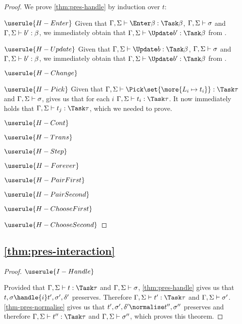 \begin{proof}
  We prove \cref{thm:pres-handle} by induction over $t$:

\case
  {$\userule{H-Enter}$}
  {Given that $\Gamma,\Sigma\infers \Enter \beta :\Task\beta$, $\Gamma,\Sigma\vdash\sigma$ and $\Gamma,\Sigma\vdash b':\beta$, we immediately obtain that $\Gamma,\Sigma\infers\Update b':\Task\beta$ from . }

\case
  {$\userule{H-Update}$}
  {Given that $\Gamma,\Sigma\infers \Update b :\Task\beta$, $\Gamma,\Sigma\vdash\sigma$ and $\Gamma,\Sigma\vdash b':\beta$, we immediately obtain that $\Gamma,\Sigma\infers\Update b':\Task\beta$ from .}

\case
  {$\userule{H-Change}$}
  {\todo{}}

\case
  {$\userule{H-Pick}$}
  {Given that $\Gamma,\Sigma\infers \Pick\set{\more{L_i \mapsto t_i}} :\Task\tau$ and $\Gamma,\Sigma\vdash\sigma$,  gives us that for each $i$ $\Gamma,\Sigma\infers t_i:\Task\tau$.
  It now immediately holds that $\Gamma,\Sigma\infers t_j:\Task\tau$, which we needed to prove.}

\case
  {$\userule{H-Cont}$}
  {}

\case
  {$\userule{H-Trans}$}
  {}

\case
  {$\userule{H-Step}$}
  {}

\case
  {$\userule{H-Forever}$}
  {}

\case
  {$\userule{H-PairFirst}$}
  {}

\case
  {$\userule{H-PairSecond}$}
  {}

\case
  {$\userule{H-ChooseFirst}$}
  {}

\case
  {$\userule{H-ChooseSecond}$}
  {}


\end{proof}

\subsection{\cref{thm:pres-interaction}}

\begin{proof}
  $\userule{I-Handle}$

  Provided that $\Gamma,\Sigma\infers t:\Task\tau$ and $\Gamma,\Sigma\vdash \sigma$,  \cref{thm:pres-handle} gives us that $t,\sigma\handle{i}t',\sigma',\delta'$ preserves.
  Therefore $\Gamma,\Sigma\infers t':\Task\tau$ and $\Gamma,\Sigma\vdash \sigma'$.
  \cref{thm-pres-normalise} gives us that $t',\sigma',\delta'\normalise t'',\sigma''$ preserves and therefore $\Gamma,\Sigma\infers t'':\Task\tau$ and $\Gamma,\Sigma\vdash \sigma''$, which proves this theorem.

\end{proof}


